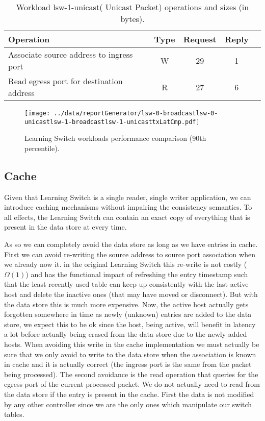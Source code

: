 \begin{table}[ht]
\centering 
\begin{tabular}{l c c c c}
 Operation & Type & Request & Reply \\ \toprule 
Associate source address to ingress port & W & 29 & 1\\\midrule
Read egress port for destination address & R & 27 & 6 \\\bottomrule
\end{tabular}
\caption[Workload lsw-1-unicast( Unicast Packet) operations]{Workload lsw-1-unicast( Unicast Packet) operations and sizes (in bytes).}
\label{table:lsw1:unicast}
\end{table}

\begin{figure}[ht]
\centering
\texttt{[image: ../data/reportGenerator/lsw-0-broadcastlsw-0-unicastlsw-1-broadcastlsw-1-unicasttxLatCmp.pdf]}
\caption[Learning Switch workloads performance comparison]{Learning
  Switch workloads performance comparison (90th percentile). }
\label{fig:lsw:comparison}
\end{figure}


\subsection{Cache}
\label{sec.learning.switch.lru.cache} 
\label{sec:feasibility:ls:cache}

Given that Learning Switch is a single reader, single writer
application, we can introduce caching mechanisms without impairing the
consistency semantics. To all effects, the Learning Switch can contain
an exact copy of everything that is present in the data store at every time.

As so we can completely avoid the data store as long as we have
entries in cache.
First we can avoid re-writing the source address to source port association when we already now it.
in the original Learning Switch this re-write is not costly
($\Omega(1)$) and has the functional impact of refreshing the entry
timestamp such that the least recently used table can keep up
consistently with the last active host and delete the inactive ones
(that may have moved or disconnect). But with the data store this is
much more expensive. 
Now, the active host
actually gets forgotten somewhere in time as newly (unknown) entries
are added to the data store, we expect this to be ok since the host,
being active, will benefit in latency a lot before actually being
erased from the data store due to the newly added hosts. 
When avoiding this write in the cache implementation we must actually be sure that we only
avoid to write to the data store when the association is known in
cache and it is actually correct (the ingress port is the same from
the packet being processed). 
The second avoidance is the read operation that queries for the egress
port of the current processed packet. We do not actually need to read
from the data store if the entry is present in the cache. First the
data is not modified by any other controller since we are the only
ones which manipulate our switch tables. 


